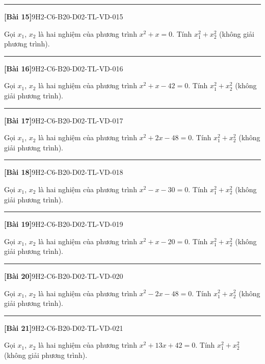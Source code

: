 \documentclass[12pt,a4paper]{article}
\newif\ifloigiai
\newenvironment{cauhoi}[2]{%
  \par\medskip\noindent\rule{\textwidth}{0.4pt}\par\nopagebreak
  \noindent\textbf{[#1]}\hfill{\scriptsize\ttfamily #2}\par\nopagebreak\smallskip}{\par}
\newcommand{\loigiai}[1]{\ifloigiai\par\smallskip\noindent\textit{Lời giải.} #1\par\fi}
\begin{document}
\begin{cauhoi}{Bài 15}{9H2-C6-B20-D02-TL-VD-015}
Gọi $x_1$, $x_2$ là hai nghiệm của phương trình $x^{2}+x=0$. Tính $x_1^{2}+x_2^{2}$ (không giải phương trình).
\loigiai{Theo định lí Viète: $x_1+x_2=-1$, $x_1x_2=0$. Suy ra $x_1^{2}+x_2^{2}=(x_1+x_2)^{2}-2x_1x_2=-1^{2}-2\cdot(0)=1$.}
\end{cauhoi}
\begin{cauhoi}{Bài 16}{9H2-C6-B20-D02-TL-VD-016}
Gọi $x_1$, $x_2$ là hai nghiệm của phương trình $x^{2}+x-42=0$. Tính $x_1^{2}+x_2^{2}$ (không giải phương trình).
\loigiai{Theo định lí Viète: $x_1+x_2=-1$, $x_1x_2=-42$. Suy ra $x_1^{2}+x_2^{2}=(x_1+x_2)^{2}-2x_1x_2=-1^{2}-2\cdot(-42)=85$.}
\end{cauhoi}
\begin{cauhoi}{Bài 17}{9H2-C6-B20-D02-TL-VD-017}
Gọi $x_1$, $x_2$ là hai nghiệm của phương trình $x^{2}+2x-48=0$. Tính $x_1^{2}+x_2^{2}$ (không giải phương trình).
\loigiai{Theo định lí Viète: $x_1+x_2=-2$, $x_1x_2=-48$. Suy ra $x_1^{2}+x_2^{2}=(x_1+x_2)^{2}-2x_1x_2=-2^{2}-2\cdot(-48)=100$.}
\end{cauhoi}
\begin{cauhoi}{Bài 18}{9H2-C6-B20-D02-TL-VD-018}
Gọi $x_1$, $x_2$ là hai nghiệm của phương trình $x^{2}-x-30=0$. Tính $x_1^{2}+x_2^{2}$ (không giải phương trình).
\loigiai{Theo định lí Viète: $x_1+x_2=1$, $x_1x_2=-30$. Suy ra $x_1^{2}+x_2^{2}=(x_1+x_2)^{2}-2x_1x_2=1^{2}-2\cdot(-30)=61$.}
\end{cauhoi}
\begin{cauhoi}{Bài 19}{9H2-C6-B20-D02-TL-VD-019}
Gọi $x_1$, $x_2$ là hai nghiệm của phương trình $x^{2}+x-20=0$. Tính $x_1^{2}+x_2^{2}$ (không giải phương trình).
\loigiai{Theo định lí Viète: $x_1+x_2=-1$, $x_1x_2=-20$. Suy ra $x_1^{2}+x_2^{2}=(x_1+x_2)^{2}-2x_1x_2=-1^{2}-2\cdot(-20)=41$.}
\end{cauhoi}
\begin{cauhoi}{Bài 20}{9H2-C6-B20-D02-TL-VD-020}
Gọi $x_1$, $x_2$ là hai nghiệm của phương trình $x^{2}-2x-48=0$. Tính $x_1^{2}+x_2^{2}$ (không giải phương trình).
\loigiai{Theo định lí Viète: $x_1+x_2=2$, $x_1x_2=-48$. Suy ra $x_1^{2}+x_2^{2}=(x_1+x_2)^{2}-2x_1x_2=2^{2}-2\cdot(-48)=100$.}
\end{cauhoi}
\begin{cauhoi}{Bài 21}{9H2-C6-B20-D02-TL-VD-021}
Gọi $x_1$, $x_2$ là hai nghiệm của phương trình $x^{2}+13x+42=0$. Tính $x_1^{2}+x_2^{2}$ (không giải phương trình).
\loigiai{Theo định lí Viète: $x_1+x_2=-13$, $x_1x_2=42$. Suy ra $x_1^{2}+x_2^{2}=(x_1+x_2)^{2}-2x_1x_2=-13^{2}-2\cdot(42)=85$.}
\end{cauhoi}
\end{document}
